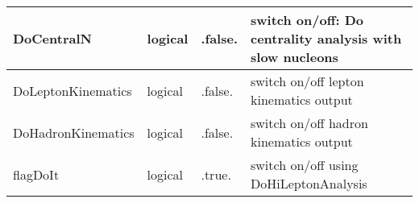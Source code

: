 \documentclass{article}
\begin{document}
\begin{longtable}{llll}
\midrule
DoCentralN & \begin{minipage}[t]{2cm}logical\end{minipage} & \begin{minipage}[t]{2cm}.false.\end{minipage} & \begin{minipage}[t]{12cm}switch on/off: Do centrality analysis with slow nucleons\end{minipage}\\*
\midrule
DoLeptonKinematics & \begin{minipage}[t]{2cm}logical\end{minipage} & \begin{minipage}[t]{2cm}.false.\end{minipage} & \begin{minipage}[t]{12cm}switch on/off lepton kinematics output\end{minipage}\\*
\midrule
DoHadronKinematics & \begin{minipage}[t]{2cm}logical\end{minipage} & \begin{minipage}[t]{2cm}.false.\end{minipage} & \begin{minipage}[t]{12cm}switch on/off hadron kinematics output\end{minipage}\\*
\midrule
flagDoIt & \begin{minipage}[t]{2cm}logical\end{minipage} & \begin{minipage}[t]{2cm}.true.\end{minipage} & \begin{minipage}[t]{12cm}switch on/off using DoHiLeptonAnalysis\end{minipage}\\*
\bottomrule
\end{longtable}
{ }



\end{document}
